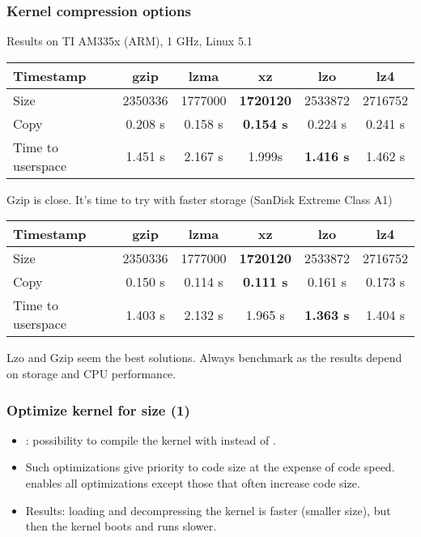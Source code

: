 \begin{frame}
\frametitle{Kernel compression options}
Results on TI AM335x (ARM), 1 GHz, Linux 5.1
{\fontsize{7}{10}\selectfont
\begin{tabular}{| l || c | c | c | c | c |}
\hline
Timestamp & gzip & lzma & xz & lzo & lz4 \\
\hline
Size & 2350336 & 1777000 & {\bf 1720120} & 2533872 & 2716752 \\
Copy & 0.208 s & 0.158 s & {\bf 0.154 s} & 0.224 s & 0.241 s \\
Time to userspace & 1.451 s & 2.167 s & 1.999s & {\bf 1.416 s} & 1.462 s \\
\hline
\end{tabular}
}
\vfill{}
Gzip is close. It's time to try with faster storage (SanDisk Extreme
Class A1)
{\fontsize{7}{10}\selectfont
\begin{tabular}{| l || c | c | c | c | c |}
\hline
Timestamp & gzip & lzma & xz & lzo & lz4 \\
\hline
Size & 2350336 & 1777000 & {\bf 1720120} & 2533872 & 2716752 \\
Copy & 0.150 s & 0.114 s & {\bf 0.111 s} & 0.161 s & 0.173 s \\
Time to userspace & 1.403 s & 2.132 s & 1.965 s & {\bf 1.363 s} & 1.404 s \\
\hline
\end{tabular}
}
\newline\newline
Lzo and Gzip seem the best solutions. Always benchmark as the results
depend on storage and CPU performance.
\end{frame}

\begin{frame}
\frametitle{Optimize kernel for size (1)}
\begin{itemize}
\item {}: possibility to compile the kernel
      with  instead of .
\item Such optimizations give priority to code size at the expense of code speed.
       enables all  optimizations except those that
      often increase code size.
\item Results: loading and decompressing the kernel is faster (smaller
      size), but then the kernel boots and runs slower.
\end{itemize}
\end{frame}

